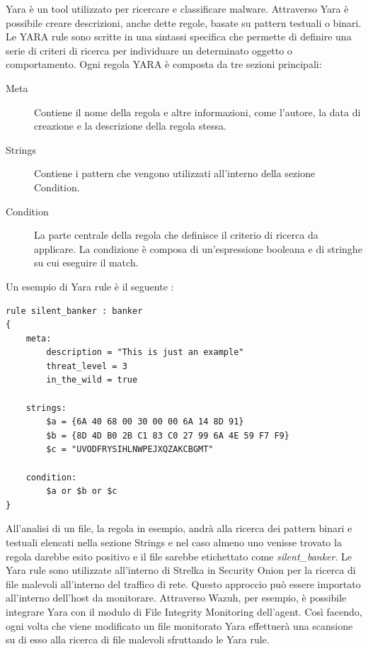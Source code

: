 \smallskip
Yara \cite{yara} è un tool utilizzato per ricercare e classificare malware. Attraverso Yara è possibile creare descrizioni, anche dette regole, basate su pattern testuali o binari.
Le YARA rule sono scritte in una sintassi specifica che permette di definire una serie di criteri di ricerca per individuare un determinato oggetto o comportamento. Ogni regola YARA è composta da tre sezioni principali:
\begin{description}
    \item [Meta] Contiene il nome della regola e altre informazioni, come l'autore, la data di creazione e la descrizione della regola stessa.
    \item [Strings] Contiene i pattern che vengono utilizzati all'interno della sezione Condition.
    \item [Condition] La parte centrale della regola che definisce il criterio di ricerca da applicare. La condizione è composa di un'espressione booleana e di stringhe su cui eseguire il match.
\end{description}

Un esempio di Yara rule è il seguente \cite{yaraexample}:
\begin{lstlisting}[caption={Esempio di Yara rule.},captionpos=b,frame=single]
rule silent_banker : banker
{
    meta:
        description = "This is just an example"
        threat_level = 3
        in_the_wild = true

    strings:
        $a = {6A 40 68 00 30 00 00 6A 14 8D 91}
        $b = {8D 4D B0 2B C1 83 C0 27 99 6A 4E 59 F7 F9}
        $c = "UVODFRYSIHLNWPEJXQZAKCBGMT"

    condition:
        $a or $b or $c
}
\end{lstlisting}


All'analisi di un file, la regola in esempio, andrà alla ricerca dei pattern binari e testuali elencati nella sezione Strings e nel caso almeno uno venisse trovato la regola darebbe esito positivo e il file sarebbe etichettato come \textit{silent\_banker}.
\smallskip
Le Yara rule sono utilizzate all'interno di Strelka in Security Onion per la ricerca di file malevoli all'interno del traffico di rete. Questo approccio può essere importato all'interno dell'host da monitorare. Attraverso Wazuh, per esempio, è possibile integrare Yara con il modulo di File Integrity Monitoring dell'agent. Così facendo, ogni volta che viene modificato un file monitorato Yara effettuerà una scansione su di esso alla ricerca di file malevoli sfruttando le Yara rule.

